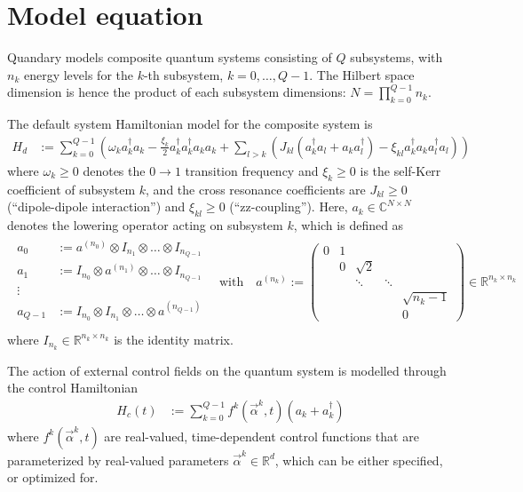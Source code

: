 \documentclass[11pt]{article}
\newcommand{\R}{\mathds{R}}
\newcommand{\C}{\mathds{C}}
\begin{document}
\section{Model equation}\label{sec:model}
Quandary models composite quantum systems consisting of $Q$ subsystems, with $n_k$ energy levels for the
$k$-th subsystem, $k=0,\dots,Q-1$. The Hilbert space dimension is hence the product of each subsystem dimensions: $N = \prod_{k=0}^{Q-1} n_k$. 

The default system Hamiltonian model for the composite system is
\begin{align}
  H_d &:= \sum_{k=0}^{Q-1} \left(\omega_k a_k^{\dagger}a_k- \frac{\xi_k}{2} a_k^{\dagger}a_k^{\dagger}a_k a_k  + \sum_{l> k} \left(  J_{kl} \left( a_k^\dagger a_l + a_k a_l^\dagger \right) -\xi_{kl} a_{k}^{\dagger}a_{k}   a_{l}^{\dagger} a_{l} \right)\right)
\end{align}
where $\omega_k\geq 0$ denotes the $0 \rightarrow 1$ transition frequency and $\xi_k\geq 0$ is the self-Kerr coefficient of subsystem $k$, and the cross resonance coefficients are $J_{kl}\geq 0$ (``dipole-dipole interaction'') and $\xi_{kl}\geq 0$ (``zz-coupling''). Here,
$a_k\in \C^{N\times N}$ denotes the lowering operator acting on subsystem $k$, which is defined as
\begin{align}
  \begin{array}{rl}
  a_0 &:= a^{(n_0)} \otimes I_{n_1} \otimes \dots \otimes
  I_{n_{Q-1}}\\
  a_1 &:= I_{n_0} \otimes a^{(n_1)} \otimes \dots \otimes
  I_{n_{Q-1}}\\
  \vdots \, & \\
  a_{Q-1} &:= I_{n_0} \otimes I_{n_1} \otimes \dots \otimes
  a^{(n_{Q-1})}\\
  \end{array}
  \quad \text{with}\quad
 a^{(n_k)} := \begin{pmatrix}
   0 & 1 &          &         &    \\
     & 0 & \sqrt{2} &         &     \\
     &   & \ddots   & \ddots  &    \\
     &   &          &         & \sqrt{n_k-1}  \\
     &   &          &         & 0   
 \end{pmatrix} \in \R^{n_k \times n_k}
\end{align}
where $I_{n_k} \in \R^{n_k \times n_k}$ is the identity matrix.



The action of external control fields on the quantum system is modelled through the control Hamiltonian 
\begin{align}
  H_c(t) &:= \sum_{k=0}^{Q-1} f^k(\vec{\alpha}^k,t) \left(a_k + a_k^\dagger \right)
\end{align}
where $f^k(\vec{\alpha}^k,t)$ are real-valued, time-dependent control functions that are parameterized by real-valued parameters $\vec{\alpha}^k\in \R^d$, which can be either specified, or optimized for. 
\end{document}
